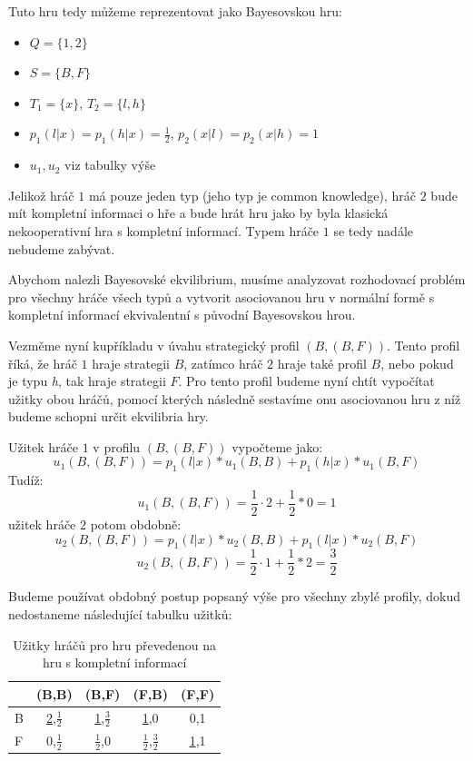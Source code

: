 \documentclass[12pt,a4paper,titlepage,final]{article}
\begin{document}
Tuto hru tedy můžeme reprezentovat jako Bayesovskou hru:
\begin{itemize}
	\item $Q = \{1,2\}$
	\item $S = \{B,F\}$
	\item $T_{1} = \{x\}$, $T_{2} = \{l,h\}$
	\item $p_{1}(l|x) = p_{1}(h|x) = \frac{1}{2}$, $p_{2}(x|l) = p_{2}(x|h) = 1$\\
	\item $u_{1}, u_{2}$ viz tabulky výše
\end{itemize}

Jelikož hráč $1$ má pouze jeden typ (jeho typ je common knowledge), hráč $2$ bude mít kompletní informaci o hře a bude hrát hru jako by byla klasická nekooperativní hra s kompletní informací.
Typem hráče $1$ se tedy nadále nebudeme zabývat.

Abychom nalezli Bayesovské ekvilibrium, musíme analyzovat rozhodovací problém pro všechny hráče všech typů a vytvorit asociovanou hru v normální formě s kompletní informací ekvivalentní s původní Bayesovskou hrou.

Vezměme nyní kupříkladu v úvahu strategický profil $(B, (B,F))$.
Tento profil říká, že hráč $1$ hraje strategii $B$, zatímco hráč $2$ hraje také profil $B$, nebo pokud je typu \emph{h}, tak hraje strategii $F$.
Pro tento profil budeme nyní chtít vypočítat užitky obou hráčů, pomocí kterých následně sestavíme onu asociovanou hru z níž budeme schopni určit ekvilibria hry.

Užitek hráče $1$ v profilu $(B, (B,F))$ vypočteme jako:
$$ u_{1}(B,(B,F)) = p_{1}(l|x) * u_1(B,B) + p_{1}(h|x) * u_1(B,F) $$
Tudíž:
$$u_{1}(B,(B,F)) = \frac{1}{2} \cdot 2 + \frac{1}{2} * 0 = 1$$
užitek hráče $2$ potom obdobně:
$$u_{2}(B,(B,F)) = p_{1}(l|x) * u_2(B,B) + p_{1}(l|x) * u_2(B,F) $$
$$u_{2}(B,(B,F)) = \frac{1}{2} \cdot 1 + \frac{1}{2} * 2 = \frac{3}{2}$$

Budeme používat obdobný postup popsaný výše pro všechny zbylé profily, dokud nedostaneme následující tabulku užitků:

\begin{table}[h]
	\centering
	\begin{tabular}{|l|c|c|c|c|}
  		\hline                        
  			 	   & (B,B)               & (B,F)            & (F,B)                         & (F,F) \\
  		\hline                       
			B      &   \underline{2},$\frac{1}{2}$   &  \underline{1},\underline{$\frac{3}{2}$} &  \underline{1},0                          &  0,1 \\
  		\hline                       
  			F      &   0,$\frac{1}{2}$   &  $\frac{1}{2}$,0 &  $\frac{1}{2}$,\underline{$\frac{3}{2}$}  &  \underline{1},1 \\
  		\hline  
	\end{tabular}
	\caption{Užitky hráčů pro hru převedenou na hru s kompletní informací}
\end{table}
\end{document}
